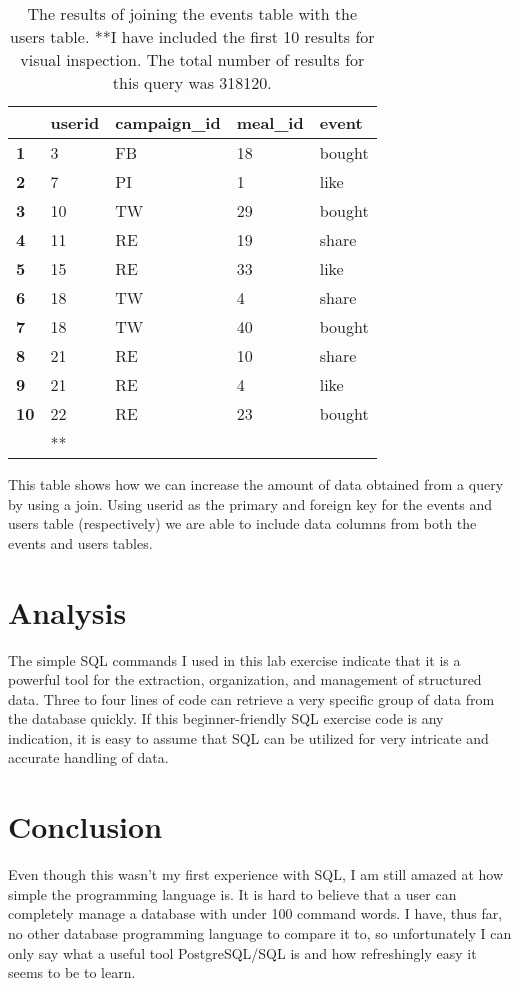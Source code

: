 \documentclass[]{article}
\begin{document}
\begin{enumerate}
\begin{table}[!ht]
	\centering
	\begin{tabular}{| l | l  l  l l| }
		\hline
		&\textbf{userid} & \textbf{campaign\_id} & \textbf{meal\_id} & \textbf{event}\\
		\hline
		\textbf{1}&3 & FB & 18 & bought\\
		\textbf{2}& 7& PI & 1 & like\\
		\textbf{3}&10 & TW & 29 & bought\\
		\textbf{4}& 11& RE & 19 & share\\
		\textbf{5}& 15& RE & 33 & like\\
		\textbf{6}& 18& TW & 4 & share\\
		\textbf{7}& 18& TW & 40 & bought\\
		\textbf{8}& 21& RE & 10 & share\\
		\textbf{9}&21& RE & 4 & like\\
		\textbf{10}& 22& RE & 23 & bought\\
		\textbf{}&** &  &  & \\
		\hline
	\end{tabular}
	\caption{The results of joining the events table with the users table. **I have included the first 10 results for visual inspection.  The total number of results for this query was 318120.}
\end{table}
This table shows how we can increase the amount of data obtained from a query by using a join.  Using userid as the primary and foreign key for the events and users table (respectively) we are able to include data columns from both the events and users tables.
\end{enumerate}
\section{Analysis}
The simple SQL commands I used in this lab exercise indicate that it is a powerful tool for the extraction, organization, and management of structured data.  Three to four lines of code can retrieve a very specific group of data from the database quickly.  If this beginner-friendly SQL exercise code is any indication, it is easy to assume that SQL can be utilized for very intricate and accurate handling of data.  
\section{Conclusion}
Even though this wasn't my first experience with SQL, I am still amazed at how simple the programming language is.  It is hard to believe that a user can completely manage a database with under 100 command words.  I have, thus far, no other database programming language to compare it to, so unfortunately I can only say what a useful tool PostgreSQL/SQL is and how refreshingly easy it seems to be to learn.
\end{document}
